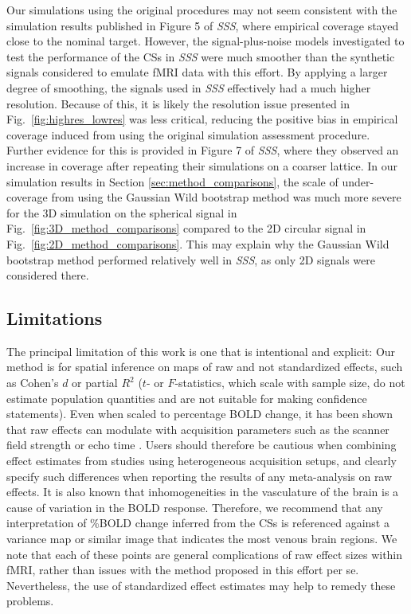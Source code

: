 Our simulations using the original procedures may not seem consistent with the simulation results published in Figure 5 of \textit{SSS}, where empirical coverage stayed close to the nominal target. However, the signal-plus-noise models investigated to test the performance of the CSs in \textit{SSS} were much smoother than the synthetic signals considered to emulate fMRI data with this effort. By applying a larger degree of smoothing, the signals used in \textit{SSS} effectively had a much higher resolution. Because of this, it is likely the resolution issue presented in Fig.\ \ref{fig:highres_lowres} was less critical, reducing the positive bias in empirical coverage induced from using the original simulation assessment procedure. Further evidence for this is provided in Figure 7 of \textit{SSS}, where they observed an increase in coverage after repeating their simulations on a coarser lattice. In our simulation results in Section \ref{sec:method_comparisons}, the scale of under-coverage from using the Gaussian Wild bootstrap method was much more severe for the 3D simulation on the spherical signal in Fig.\ \ref{fig:3D_method_comparisons} compared to the 2D circular signal in Fig.\ \ref{fig:2D_method_comparisons}. This may explain why the Gaussian Wild bootstrap method performed relatively well in \textit{SSS}, as only 2D signals were considered there. 

\subsection{Limitations}

The principal limitation of this work is one that is intentional and explicit: Our method is for spatial inference on maps of raw and not standardized effects, such as Cohen's $d$ or partial $R^{2}$ ($t$- or $F$-statistics, which scale with sample size, do not estimate population quantities and are not suitable for making  confidence statements). Even when scaled to percentage BOLD change, it has been shown that raw effects can modulate with acquisition parameters such as the scanner field strength or echo time \citep{UIudag2009-nm}. Users should therefore be cautious when combining effect estimates from studies using heterogeneous acquisition setups, and clearly specify such differences when reporting the results of any meta-analysis on raw effects. It is also known that inhomogeneities in the vasculature of the brain is a cause of variation in the BOLD response. Therefore, we recommend that any interpretation of \%BOLD change inferred from the CSs is referenced against a variance map or similar image that indicates the most venous brain regions. We note that each of these points are general complications of raw effect sizes within fMRI, rather than issues with the method proposed in this effort per se. Nevertheless, the use of standardized effect estimates may help to remedy these problems.

